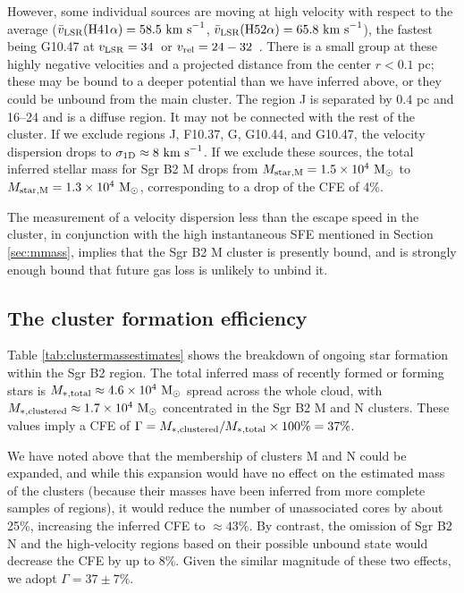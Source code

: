 \documentclass[twocolumn]{aastex62}
\begin{document}
However, some individual sources are moving at high velocity with respect to
the average ($\bar{v}_{\rm LSR}(\rm H41\alpha) = 58.5~\textrm{km~s}^{-1}$, $\bar{v}_{\rm LSR}(\rm H52\alpha)
= 65.8~\textrm{km~s}^{-1}$), the fastest being G10.47 at $v_{\rm LSR}=34$~\kms or
$v_{\rm rel}=24-32$~\kms.  There is a small group at these highly negative
velocities and a projected distance from the center $r<0.1$ pc; these may be
bound to a deeper potential than we have inferred above, or they could be unbound
from the main cluster.
The \hii region J is separated by 0.4 pc and 16--24 \kms and is a diffuse \hii
region.  It may not be connected with the rest of the cluster.
If we exclude regions J, F10.37, G, G10.44, and G10.47, the velocity dispersion
drops to $\sigma_{\rm 1D}\approx8~\textrm{km~s}^{-1}$.  If we exclude these sources, the total
inferred stellar mass for Sgr B2 M drops from $M_{\rm star,M} = 1.5\times10^{4}~\mathrm{M}_{\odot}$ to
$M_{\rm star,M}=1.3\times10^{4}~\mathrm{M}_{\odot}$, corresponding to a drop of the CFE of 4\%.

The measurement of a velocity dispersion less than the escape speed in the cluster,
in conjunction with the high instantaneous SFE mentioned in Section \ref{sec:mmass},
implies that the Sgr B2 M cluster is presently bound, and is strongly enough
bound that future gas loss is unlikely to unbind it.


\clearpage

\clearpage

\subsection{The cluster formation efficiency}
Table \ref{tab:clustermassestimates} shows the breakdown of ongoing star
formation within the Sgr B2 region.  The total inferred mass of recently
formed or forming stars is ${M_{\rm *,total}\approx4.6\times10^{4}~\mathrm{M}_{\odot}}$ spread across
the whole cloud, with ${M_{\rm *,clustered}\approx1.7\times10^{4}~\mathrm{M}_{\odot}}$ concentrated
in the Sgr B2 M and N clusters.  These values imply a CFE of
$\Gamma=M_{\rm *,clustered}/M_{\rm *,total}\times100\% = 37\%$. 

We have noted above that the membership of clusters M and N could be expanded,
and while this expansion would have no effect on the estimated mass of the clusters
(because their masses have been inferred from more complete samples of \hii regions),
it would reduce the number of unassociated cores by about 25\%, increasing the inferred
CFE to $\approx43\%$. By contrast, the omission of Sgr B2 N and the
high-velocity \hii regions based on their possible unbound state would decrease
the CFE by up to 8\%. Given the similar magnitude of these two effects, we
adopt $\Gamma=37\pm7\%$. 
\end{document}
